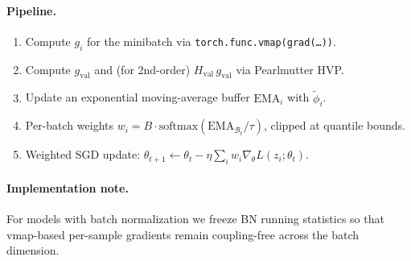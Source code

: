 \paragraph{Pipeline.}
\begin{enumerate}[leftmargin=1.4em, itemsep=2pt, topsep=3pt]
\item Compute $g_i$ for the minibatch via \texttt{torch.func.vmap(grad(\dots))}.
\item Compute $g_{\mathrm{val}}$ and (for 2nd-order) $H_{\mathrm{val}}\,g_{\mathrm{val}}$ via Pearlmutter HVP.
\item Update an exponential moving-average buffer $\mathrm{EMA}_i$ with $\widetilde\phi_i$.
\item Per-batch weights $w_i = B \cdot \mathrm{softmax}(\mathrm{EMA}_{\mathcal{B}_t} / \tau)$, clipped at quantile bounds.
\item Weighted SGD update: $\theta_{t+1} \leftarrow \theta_t - \eta \sum_i w_i \nabla_\theta L(z_i;\theta_t)$.
\end{enumerate}

\paragraph{Implementation note.}
For models with batch normalization we freeze BN running statistics so
that vmap-based per-sample gradients remain coupling-free across the
batch dimension.
